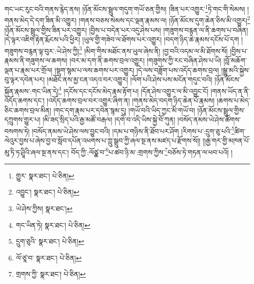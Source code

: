 གང་ཡང་རུང་བའི་གནས་རྙེད་ནས། །ཉོན་མོངས་སྦྲུལ་གདུག་གཡོ་ཅན་གྱིས། །ཟིན་པར་འགྱུར་\footnote{གྱུར་  སྣར་ཐང་།  པེ་ཅིན། }ཏེ་གང་གི་སེམས། །གནས་མེད་དེ་དག་ཟིན་མི་འགྱུར། །གནས་བཅས་སེམས་དང་ལྡན་རྣམས་ལ། །ཉོན་མོངས་དུག་ཆེན་ཅིས་མི་འགྱུར།\footnote{འབྱུང་།  སྣར་ཐང་།  པེ་ཅིན། } །ཉོན་མོངས་སྦྲུལ་གྱིས་ཟིན་པར་འགྱུར། །བྱིས་པ་བདེན་པར་འདུ་ཤེས་པས། །གཟུགས་བརྙན་ལ་ནི་ཆགས་པ་བཞིན། །དེ་ལྟར་འཇིག་རྟེན་རྨོངས་པའི་ཕྱིར། །ཡུལ་གྱི་གཟེབ་ལ་ཐོགས་པར་འགྱུར། །བདག་ཉིད་ཆེ་རྣམས་དངོས་པོ་དག །གཟུགས་བརྙན་ལྟ་བུར་:ཡེ་ཤེས་ཀྱི།\footnote{ཡེ་ཤེས་ཀྱིས།  སྣར་ཐང་། } །མིག་གིས་མཐོང་ནས་ཡུལ་ཞེས་ནི། །བྱ་བའི་འདམ་ལ་མི་ཐོགས་སོ། །བྱིས་པ་རྣམས་ནི་གཟུགས་ལ་ཆགས། །བར་མ་དག་ནི་ཆགས་བྲལ་འགྱུར། །གཟུགས་ཀྱི་རང་བཞིན་ཤེས་པ་ཡི། །བློ་མཆོག་ལྡན་པ་རྣམ་པར་གྲོལ། །སྡུག་སྙམ་པ་ལས་ཆགས་པར་འགྱུར། །དེ་ལས་བཟློག་པས་འདོད་ཆགས་བྲལ། །སྒྱུ་མའི་སྐྱེས་བུ་ལྟར་དབེན་པར། །མཐོང་ནས་མྱ་ངན་འདའ་བར་འགྱུར། །ལོག་པའི་ཤེས་པས་མངོན་གདུང་བའི། །ཉོན་མོངས་སྐྱོན་རྣམས་:གང་ཡིན་དེ།\footnote{གང་ཡིན་ཏེ།  སྣར་ཐང་།  པེ་ཅིན། } །དངོས་དང་དངོས་མེད་རྣམ་རྟོག་པ། །དོན་ཤེས་འགྱུར་ལ་མི་འབྱུང་ངོ། །གནས་ཡོད་ན་ནི་འདོད་ཆགས་དང་། །འདོད་ཆགས་བྲལ་བར་འགྱུར་ཞིག་ན། །གནས་མེད་བདག་ཉིད་ཆེན་པོ་རྣམས། །ཆགས་པ་མེད་ཅིང་ཆགས་བྲལ་མིན། །གང་དག་རྣམ་པར་དབེན་སྙམ་དུ། །གཡོ་བའི་ཡིད་ཀྱང་མི་གཡོ་བ། །ཉོན་མོངས་སྦྲུལ་གྱིས་དཀྲུགས་གྱུར་པ། །མི་ཟད་སྲིད་པའི་རྒྱ་མཚོ་བརྒལ། །དགེ་བ་འདི་ཡིས་སྐྱེ་བོ་ཀུན། །བསོད་ནམས་ཡེ་ཤེས་ཚོགས་བསགས་ཏེ། །བསོད་ནམས་ཡེ་ཤེས་ལས་བྱུང་བའི། །དམ་པ་གཉིས་ནི་ཐོབ་པར་ཤོག །རིགས་པ་:དྲུག་ཅུ་པའི་\footnote{དྲུག་ཅུའི་  སྣར་ཐང་།  པེ་ཅིན། }ཚིག་ལེའུར་བྱས་པ་ཞེས་བྱ་བ་སློབ་དཔོན་འཕགས་པ་ཀླུ་སྒྲུབ་ཀྱི་ཞལ་སྔ་ནས་མཛད་པ་རྫོགས་སོ།། །།རྒྱ་གར་གྱི་མཁན་པོ་མུ་ཏི་ཏ་ཤྲཱིའི་ཞལ་སྔ་ནས་དང་། བོད་ཀྱི་:ལོཙྪ་བ་\footnote{ལོ་ཙཱ་བ་  སྣར་ཐང་།  པེ་ཅིན། }པ་ཚབ་ཉི་མ་:གྲགས་ཀྱིས་\footnote{གྲགས་ཀྱི་  སྣར་ཐང་།  པེ་ཅིན། }བཅོས་ཏེ་གཏན་ལ་ཕབ་པའོ། ། 
